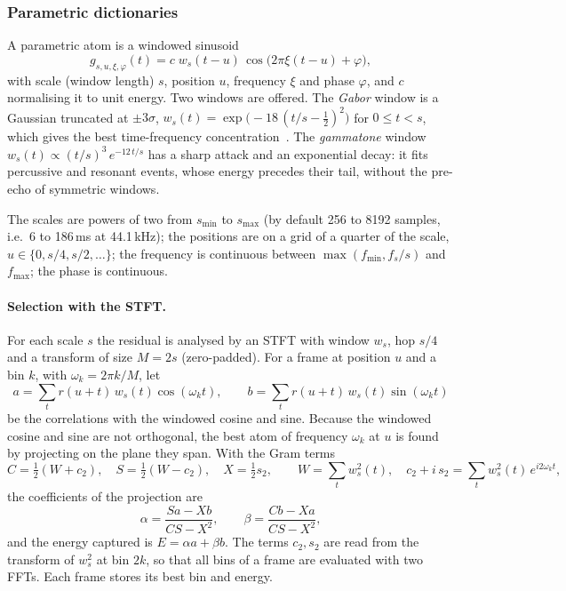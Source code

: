 \documentclass[11pt,a4paper]{article}
\begin{document}
\subsubsection{Parametric dictionaries}

A parametric atom is a windowed sinusoid
\begin{equation}
  g_{s,u,\xi,\varphi}(t) = c \; w_s(t - u)\, \cos\bigl(2\pi \xi (t-u) + \varphi\bigr),
\end{equation}
with scale (window length) $s$, position $u$, frequency $\xi$ and phase
$\varphi$, and $c$ normalising it to unit energy. Two windows are offered.
The \emph{Gabor} window is a Gaussian truncated at $\pm 3\sigma$,
$w_s(t) = \exp\bigl(-18\,(t/s - \tfrac12)^2\bigr)$ for $0 \le t < s$, which
gives the best time-frequency concentration~\cite{gabor1947}. The
\emph{gammatone} window
$w_s(t) \propto (t/s)^3 \, e^{-12\, t/s}$ has a sharp attack and an
exponential decay: it fits percussive and resonant events, whose energy
precedes their tail, without the pre-echo of symmetric windows.

The scales are powers of two from $s_{\min}$ to $s_{\max}$ (by default 256
to 8192 samples, i.e.\ 6 to 186\,ms at 44.1\,kHz); the positions are on a
grid of a quarter of the scale, $u \in \{0, s/4, s/2, \dots\}$; the frequency
is continuous between $\max(f_{\min}, f_s/s)$ and $f_{\max}$; the phase is
continuous.

\paragraph{Selection with the STFT.} For each scale $s$ the residual is
analysed by an STFT with window $w_s$, hop $s/4$ and a transform of size
$M = 2s$ (zero-padded). For a frame at position $u$ and a bin $k$, with
$\omega_k = 2\pi k / M$, let
\begin{equation}
  a = \sum_t r(u+t)\, w_s(t) \cos(\omega_k t), \qquad
  b = \sum_t r(u+t)\, w_s(t) \sin(\omega_k t)
\end{equation}
be the correlations with the windowed cosine and sine. Because the windowed
cosine and sine are not orthogonal, the best atom of frequency $\omega_k$ at
$u$ is found by projecting on the plane they span. With the Gram terms
\begin{equation}
  C = \tfrac12 (W + c_2), \quad S = \tfrac12 (W - c_2), \quad X = \tfrac12 s_2, \qquad
  W = \sum_t w_s^2(t), \quad c_2 + i\, s_2 = \sum_t w_s^2(t)\, e^{i 2\omega_k t},
\end{equation}
the coefficients of the projection are
\begin{equation}
  \alpha = \frac{S a - X b}{C S - X^2}, \qquad
  \beta = \frac{C b - X a}{C S - X^2},
\end{equation}
and the energy captured is $E = \alpha a + \beta b$. The terms $c_2, s_2$ are
read from the transform of $w_s^2$ at bin $2k$, so that all bins of a frame
are evaluated with two FFTs. Each frame stores its best bin and energy.
\end{document}
